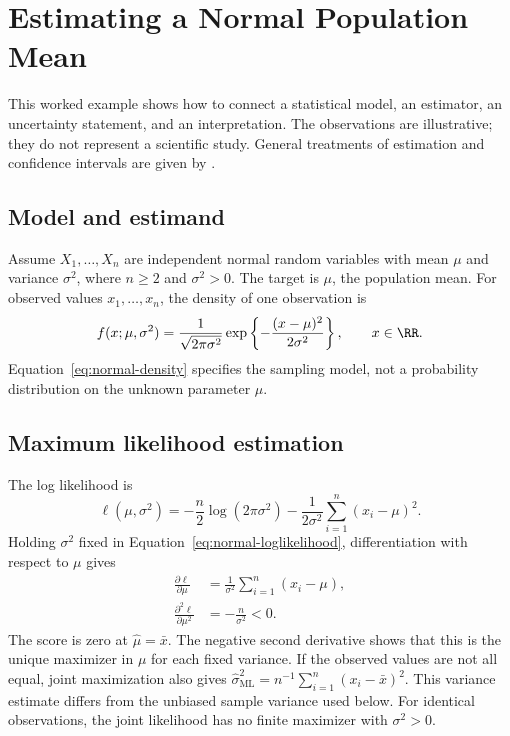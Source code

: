 \chapter{Estimating a Normal Population Mean}
\label{chap:normal-mean}


This worked example shows how to connect a statistical model, an estimator,
an uncertainty statement, and an interpretation. The observations are
illustrative; they do not represent a scientific study. General treatments of
estimation and confidence intervals are given by \citet{wasserman2004all}.


\section{Model and estimand}
Assume $X_1,\ldots,X_n$ are independent normal random variables with mean
$\mu$ and variance $\sigma^2$, where $n\geq 2$ and $\sigma^2>0$. The target is
$\mu$, the population mean. For observed values $x_1,\ldots,x_n$, the density
of one observation is
\begin{equation}
  \label{eq:normal-density}
  f(x;\mu,\sigma^2)
  = \frac{1}{\sqrt{2\pi\sigma^2}}
    \exp\left\{-\frac{(x-\mu)^2}{2\sigma^2}\right\},
  \qquad x\in\RR.
\end{equation}
Equation~\eqref{eq:normal-density} specifies the sampling model, not a
probability distribution on the unknown parameter $\mu$.


\section{Maximum likelihood estimation}
The log likelihood is
\begin{equation}
  \label{eq:normal-loglikelihood}
  \ell(\mu,\sigma^2)
  = -\frac{n}{2}\log(2\pi\sigma^2)
    -\frac{1}{2\sigma^2}\sum_{i=1}^{n}(x_i-\mu)^2.
\end{equation}
Holding $\sigma^2$ fixed in Equation~\eqref{eq:normal-loglikelihood},
differentiation with respect to $\mu$ gives
\begin{align*}
  \frac{\partial\ell}{\partial\mu}
    &= \frac{1}{\sigma^2}\sum_{i=1}^{n}(x_i-\mu), \\
  \frac{\partial^2\ell}{\partial\mu^2}
    &= -\frac{n}{\sigma^2}<0.
\end{align*}
The score is zero at $\widehat{\mu}=\bar{x}$. The negative second derivative
shows that this is the unique maximizer in $\mu$ for each fixed variance.
If the observed values are not all equal, joint maximization also gives
$\widehat{\sigma}^2_{\mathrm{ML}}
= n^{-1}\sum_{i=1}^{n}(x_i-\bar{x})^2$. This variance estimate differs from
the unbiased sample variance used below. For identical observations, the
joint likelihood has no finite maximizer with $\sigma^2>0$.


